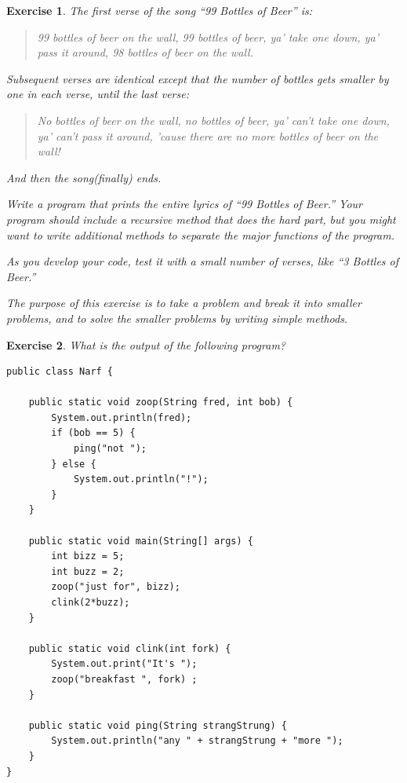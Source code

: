 \documentclass[12pt]{book}
\theoremstyle{exercise}
\newtheorem{exercise}{Exercise}[chapter]
\begin{document}
\begin{exercise}

The first verse of the song ``99 Bottles of Beer'' is:

\begin{quote}
99 bottles of beer on the wall,
99 bottles of beer,
ya' take one down, ya' pass it around,
98 bottles of beer on the wall.
\end{quote}

Subsequent verses are identical except that the number
of bottles gets smaller by one in each verse, until the
last verse:

\begin{quote}
No bottles of beer on the wall,
no bottles of beer,
ya' can't take one down, ya' can't pass it around,
'cause there are no more bottles of beer on the wall!
\end{quote}
%
And then the song(finally) ends.

Write a program that prints the entire lyrics of
``99 Bottles of Beer.''  Your program should include a
recursive method that does the hard part, but you
might want to write additional methods to separate the major
functions of the program.

As you develop your code, test it with a small number of
verses, like ``3 Bottles of Beer.''

The purpose of this exercise is to take a problem and break it
into smaller problems, and to solve the smaller problems by writing
simple methods.
\end{exercise}

\begin{exercise}

What is the output of the following program?

\begin{lstlisting}
public class Narf {

    public static void zoop(String fred, int bob) {
        System.out.println(fred);
        if (bob == 5) {
            ping("not ");
        } else {
            System.out.println("!");
        }
    }

    public static void main(String[] args) {
        int bizz = 5;
        int buzz = 2;
        zoop("just for", bizz);
        clink(2*buzz);
    }

    public static void clink(int fork) {
        System.out.print("It's ");
        zoop("breakfast ", fork) ;
    }

    public static void ping(String strangStrung) {
        System.out.println("any " + strangStrung + "more ");
    }
}
\end{lstlisting}
\end{exercise}
\end{document}
